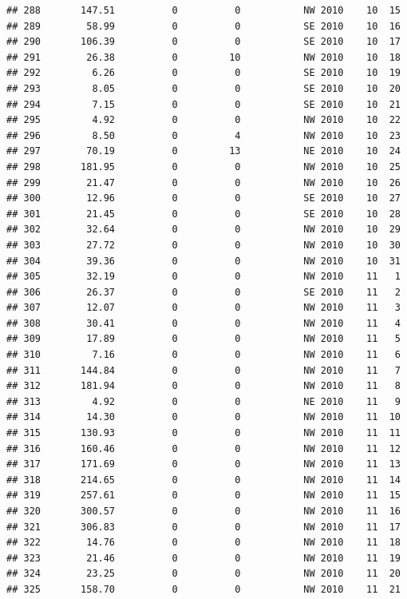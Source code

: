 \documentclass[
]{article}
\begin{document}
\begin{verbatim}
## 288       147.51          0          0           NW 2010    10  15
## 289        58.99          0          0           SE 2010    10  16
## 290       106.39          0          0           SE 2010    10  17
## 291        26.38          0         10           NW 2010    10  18
## 292         6.26          0          0           SE 2010    10  19
## 293         8.05          0          0           SE 2010    10  20
## 294         7.15          0          0           SE 2010    10  21
## 295         4.92          0          0           NW 2010    10  22
## 296         8.50          0          4           NW 2010    10  23
## 297        70.19          0         13           NE 2010    10  24
## 298       181.95          0          0           NW 2010    10  25
## 299        21.47          0          0           NW 2010    10  26
## 300        12.96          0          0           SE 2010    10  27
## 301        21.45          0          0           SE 2010    10  28
## 302        32.64          0          0           NW 2010    10  29
## 303        27.72          0          0           NW 2010    10  30
## 304        39.36          0          0           NW 2010    10  31
## 305        32.19          0          0           NW 2010    11   1
## 306        26.37          0          0           SE 2010    11   2
## 307        12.07          0          0           NW 2010    11   3
## 308        30.41          0          0           NW 2010    11   4
## 309        17.89          0          0           NW 2010    11   5
## 310         7.16          0          0           NW 2010    11   6
## 311       144.84          0          0           NW 2010    11   7
## 312       181.94          0          0           NW 2010    11   8
## 313         4.92          0          0           NE 2010    11   9
## 314        14.30          0          0           NW 2010    11  10
## 315       130.93          0          0           NW 2010    11  11
## 316       160.46          0          0           NW 2010    11  12
## 317       171.69          0          0           NW 2010    11  13
## 318       214.65          0          0           NW 2010    11  14
## 319       257.61          0          0           NW 2010    11  15
## 320       300.57          0          0           NW 2010    11  16
## 321       306.83          0          0           NW 2010    11  17
## 322        14.76          0          0           NW 2010    11  18
## 323        21.46          0          0           NW 2010    11  19
## 324        23.25          0          0           NW 2010    11  20
## 325       158.70          0          0           NW 2010    11  21

\end{verbatim}
\end{document}
